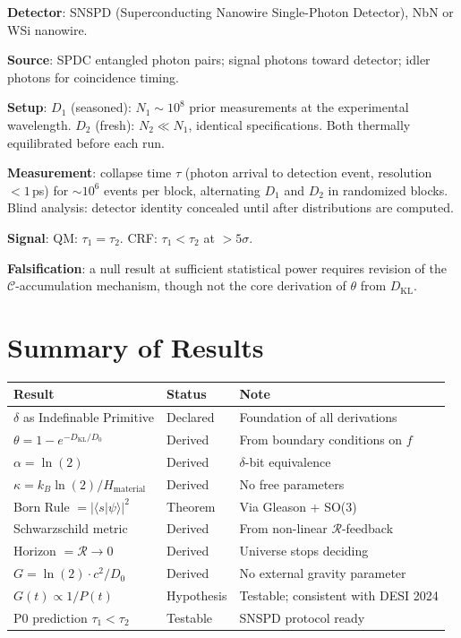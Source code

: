 \documentclass[12pt]{article}
\begin{document}
\textbf{Detector}: SNSPD (Superconducting Nanowire Single-Photon
Detector), NbN or WSi nanowire.

\textbf{Source}: SPDC entangled photon pairs; signal photons toward
detector; idler photons for coincidence timing.

\textbf{Setup}: $D_1$ (seasoned): $N_1 \sim 10^8$ prior
measurements at the experimental wavelength.
$D_2$ (fresh): $N_2 \ll N_1$, identical specifications.
Both thermally equilibrated before each run.

\textbf{Measurement}: collapse time $\tau$ (photon arrival to
detection event, resolution $<1$\,ps) for $\sim 10^6$ events per
block, alternating $D_1$ and $D_2$ in randomized blocks.
Blind analysis: detector identity concealed until after
distributions are computed.

\textbf{Signal}: QM: $\tau_1 = \tau_2$.
CRF: $\tau_1 < \tau_2$ at $>5\sigma$.

\textbf{Falsification}: a null result at sufficient statistical
power requires revision of the $\mathcal{C}$-accumulation
mechanism, though not the core derivation of $\theta$ from
$D_{\mathrm{KL}}$.

\section{Summary of Results}

\begin{center}
\renewcommand{\arraystretch}{1.6}
\begin{tabular}{p{5.5cm} p{2.2cm} p{4.5cm}}
\toprule
\textbf{Result} & \textbf{Status} & \textbf{Note} \\
\midrule
$\delta$ as Indefinable Primitive
  & Declared & Foundation of all derivations \\
$\theta = 1 - e^{-D_{\mathrm{KL}}/D_0}$
  & Derived & From boundary conditions on $f$ \\
$\alpha = \ln(2)$
  & Derived & $\delta$-bit equivalence \\
$\kappa = k_B\ln(2)/H_{\mathrm{material}}$
  & Derived & No free parameters \\
Born Rule $= |\langle s|\psi\rangle|^2$
  & Theorem & Via Gleason + SO(3) \\
Schwarzschild metric
  & Derived & From non-linear $\mathcal{R}$-feedback \\
Horizon $= \mathcal{R} \to 0$
  & Derived & Universe stops deciding \\
$G = \ln(2)\cdot c^2/D_0$
  & Derived & No external gravity parameter \\
$G(t) \propto 1/P(t)$
  & Hypothesis & Testable; consistent with DESI 2024 \\
P0 prediction $\tau_1 < \tau_2$
  & Testable & SNSPD protocol ready \\
\bottomrule
\end{tabular}
\end{center}
\end{document}
